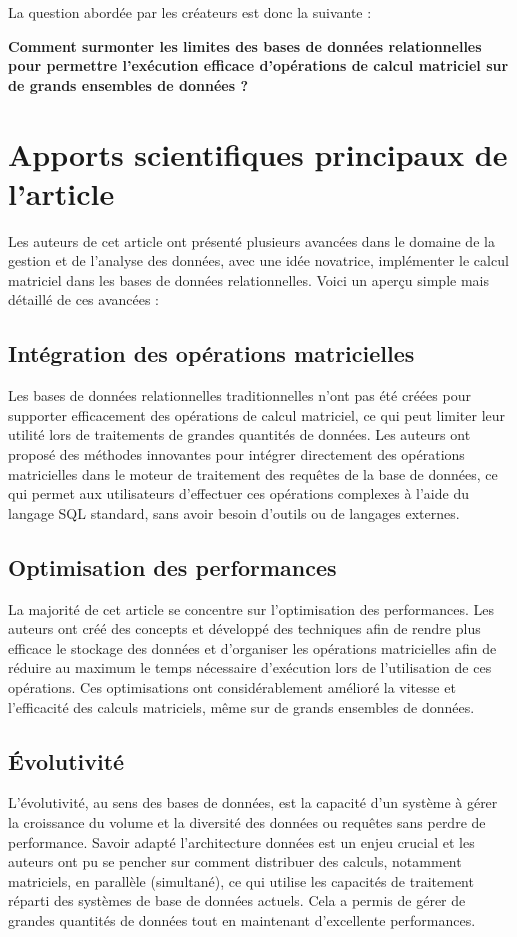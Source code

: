 \documentclass[a4paper, 12pt]{article}
\begin{document}
La question abordée par les créateurs est donc la suivante : 

\begin{center}
	\textbf{
		Comment surmonter les limites des bases de données relationnelles pour permettre l'exécution efficace d'opérations de calcul matriciel sur de grands ensembles de données ?
	}
\end{center}

\clearpage 
\section{Apports scientifiques principaux de l’article}

Les auteurs de cet article ont présenté plusieurs avancées dans le domaine de la gestion et de l'analyse des données, avec une idée novatrice, implémenter le calcul matriciel dans les bases de données relationnelles. Voici un aperçu simple mais détaillé de ces avancées :

\subsection{Intégration des opérations matricielles}
Les bases de données relationnelles traditionnelles n'ont pas été créées pour supporter efficacement des opérations de calcul matriciel, ce qui peut limiter leur utilité lors de traitements de grandes quantités de données. Les auteurs ont proposé des méthodes innovantes pour intégrer directement des opérations matricielles dans le moteur de traitement des requêtes de la base de données, ce qui permet aux utilisateurs d'effectuer ces opérations complexes à l'aide du langage SQL standard, sans avoir besoin d'outils ou de langages externes.

\subsection{Optimisation des performances}
La majorité de cet article se concentre sur l'optimisation des performances. Les auteurs ont créé des concepts et développé des techniques afin de rendre plus efficace le stockage des données et d'organiser les opérations matricielles afin de réduire au maximum le temps nécessaire d'exécution lors de l'utilisation de ces opérations. Ces optimisations ont considérablement amélioré la vitesse et l'efficacité des calculs matriciels, même sur de grands ensembles de données.

\subsection{Évolutivité}
L’évolutivité, au sens des bases de données, est la capacité d'un système à gérer la croissance du volume et la diversité des données ou requêtes sans perdre de performance. Savoir adapté l'architecture données est un enjeu crucial et les auteurs ont pu se pencher sur comment distribuer des calculs, notamment matriciels, en parallèle (simultané), ce qui utilise les capacités de traitement réparti des systèmes de base de données actuels. Cela a permis de gérer de grandes quantités de données tout en maintenant d'excellente performances.
\end{document}
